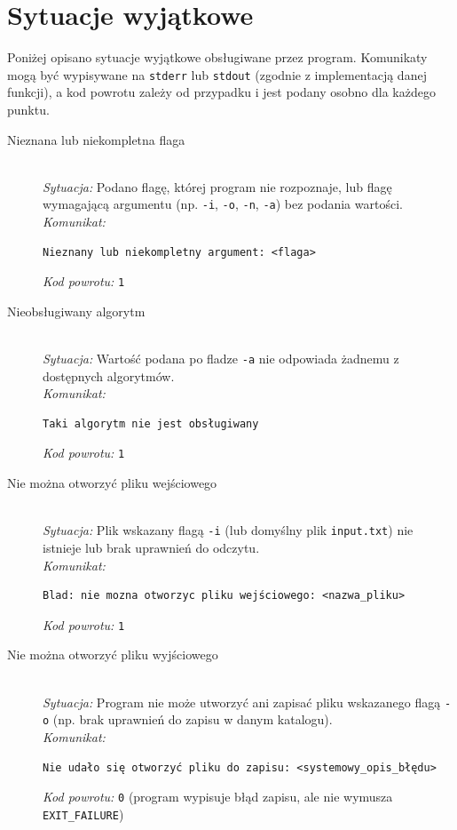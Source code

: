 \documentclass[12pt]{article}
\begin{document}
\section{Sytuacje wyjątkowe}
\label{sec:wyjatki}

Poniżej opisano sytuacje wyjątkowe obsługiwane przez program. Komunikaty mogą być
wypisywane na \texttt{stderr} lub \texttt{stdout} (zgodnie z implementacją danej
funkcji), a kod powrotu zależy od przypadku i jest podany osobno dla każdego punktu.

\begin{description}

	\item[Nieznana lub niekompletna flaga]
	      \hfill \\
	      \textit{Sytuacja:} Podano flagę, której program nie rozpoznaje, lub flagę
	      wymagającą argumentu (np. \texttt{-i}, \texttt{-o}, \texttt{-n}, \texttt{-a}) bez
	      podania wartości. \\
	      \textit{Komunikat:}
	      \begin{verbatim}
Nieznany lub niekompletny argument: <flaga>
	      \end{verbatim}
	      \textit{Kod powrotu:} \texttt{1}

	\item[Nieobsługiwany algorytm]
	      \hfill \\
	      \textit{Sytuacja:} Wartość podana po fladze \texttt{-a} nie odpowiada
	      żadnemu z dostępnych algorytmów. \\
	      \textit{Komunikat:}
	      \begin{verbatim}
Taki algorytm nie jest obsługiwany
	      \end{verbatim}
	      \textit{Kod powrotu:} \texttt{1}

	\item[Nie można otworzyć pliku wejściowego]
	      \hfill \\
	      \textit{Sytuacja:} Plik wskazany flagą \texttt{-i} (lub domyślny plik
	      \texttt{input.txt}) nie istnieje lub brak uprawnień do odczytu. \\
	      \textit{Komunikat:}
	      \begin{verbatim}
Blad: nie mozna otworzyc pliku wejściowego: <nazwa_pliku>
	      \end{verbatim}
	      \textit{Kod powrotu:} \texttt{1}

	\item[Nie można otworzyć pliku wyjściowego]
	      \hfill \\
	      \textit{Sytuacja:} Program nie może utworzyć ani zapisać pliku wskazanego
	      flagą \texttt{-o} (np. brak uprawnień do zapisu w danym katalogu). \\
	      \textit{Komunikat:}
	      \begin{verbatim}
Nie udało się otworzyć pliku do zapisu: <systemowy_opis_błędu>
	      \end{verbatim}
	      \textit{Kod powrotu:} \texttt{0} (program wypisuje błąd zapisu, ale nie wymusza \texttt{EXIT\_FAILURE})


\end{description}
\end{document}
